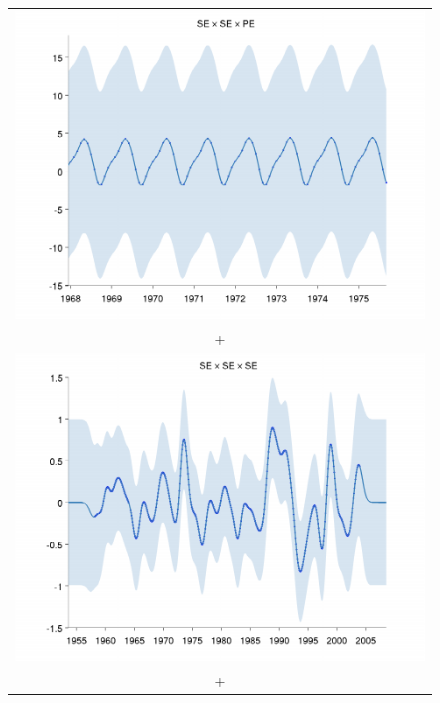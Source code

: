 \documentclass[twoside]{article}
\begin{document}
\begin{figure}[h!]
\begin{tabular}{c}
 \includegraphics[width=\wmgd,height=\hmgd]{../figures/decomposition/03-mauna2003_max_level_8/03-mauna2003_4_zoom} \\ + \\
 \includegraphics[width=\wmgd,height=\hmgd]{../figures/decomposition/03-mauna2003_max_level_8/03-mauna2003_1} \\ + \\

\end{tabular}
\end{figure}
\end{document}
